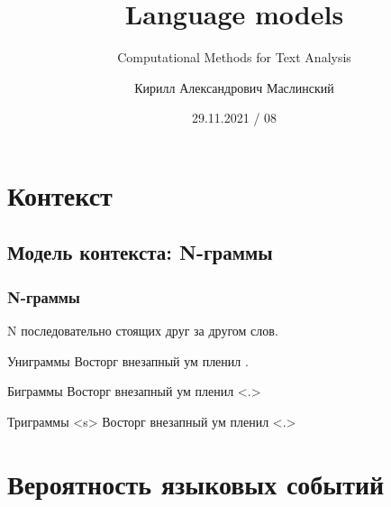 \documentclass[10pt,svgnames]{beamer}
\title[CMTA 08] %
{Language models}
\subtitle
{Computational Methods for Text Analysis} %
\author%
{Кирилл Александрович Маслинский}
\institute%
{НИУ ВШЭ Санкт-Петербург}
\date%
{29.11.2021 / 08}
\begin{document}
\begin{frame}
  \titlepage
\end{frame}

\section{Контекст}


\subsection{Модель контекста: N-граммы}

\begin{frame}

  \frametitle{N-граммы}
  
  N последовательно стоящих друг за другом слов.
  
  \begin{block}{Униграммы}
    \alert<2>{Восторг} \alert<3>{внезапный} \alert<4>{ум}
    \alert<5>{пленил} .
  \end{block}

  \begin{block}{Биграммы}
  \alert<2>{Восторг} \alert<2-3>{внезапный} \alert<3-4>{ум}
  \alert<4-5>{пленил} \alert<5>{<.>}    
  \end{block}

  \begin{block}{Триграммы}
  \alert<2>{<s>}  \alert<2-3>{Восторг} \alert<2-4>{внезапный}
  \alert<3-5>{ум} \alert<4-5>{пленил} \alert<5>{<.>}
  \end{block}
\end{frame}

\section{Вероятность языковых событий}
\end{document}
